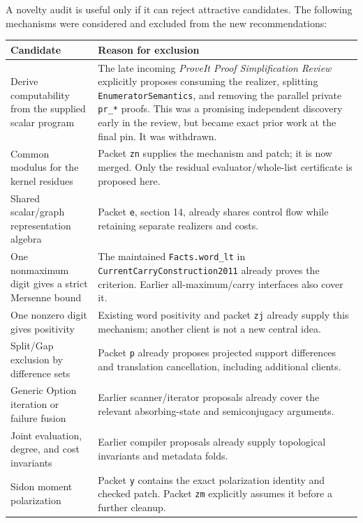 \documentclass[11pt,a4paper]{article}
\newcommand{\code}[1]{\texttt{#1}}
\begin{document}
A novelty audit is useful only if it can reject attractive candidates. The following mechanisms were considered and excluded from the new recommendations:

\begin{longtable}{@{}>{\raggedright\arraybackslash}p{}>{\raggedright\arraybackslash}p{}@{}}
\toprule
Candidate & Reason for exclusion\\
\midrule
\endhead
Derive computability from the supplied scalar program & The late incoming \emph{ProveIt Proof Simplification Review} explicitly proposes consuming the realizer, splitting \code{EnumeratorSemantics}, and removing the parallel private \code{pr\_*} proofs. This was a promising independent discovery early in the review, but became exact prior work at the final pin. It was withdrawn.\\
Common modulus for the kernel residues & Packet \code{zn} supplies the mechanism and patch; it is now merged. Only the residual evaluator/whole-list certificate is proposed here.\\
Shared scalar/graph representation algebra & Packet \code{e}, section 14, already shares control flow while retaining separate realizers and costs.\\
One nonmaximum digit gives a strict Mersenne bound & The maintained \code{Facts.word\_lt} in \code{CurrentCarryConstruction2011} already proves the criterion. Earlier all-maximum/carry interfaces also cover it.\\
One nonzero digit gives positivity & Existing word positivity and packet \code{zj} already supply this mechanism; another client is not a new central idea.\\
Split/Gap exclusion by difference sets & Packet \code{p} already proposes projected support differences and translation cancellation, including additional clients.\\
Generic Option iteration or failure fusion & Earlier scanner/iterator proposals already cover the relevant absorbing-state and semiconjugacy arguments.\\
Joint evaluation, degree, and cost invariants & Earlier compiler proposals already supply topological invariants and metadata folds.\\
Sidon moment polarization & Packet \code{y} contains the exact polarization identity and checked patch. Packet \code{zm} explicitly assumes it before a further cleanup.\\
\bottomrule
\end{longtable}
\end{document}
